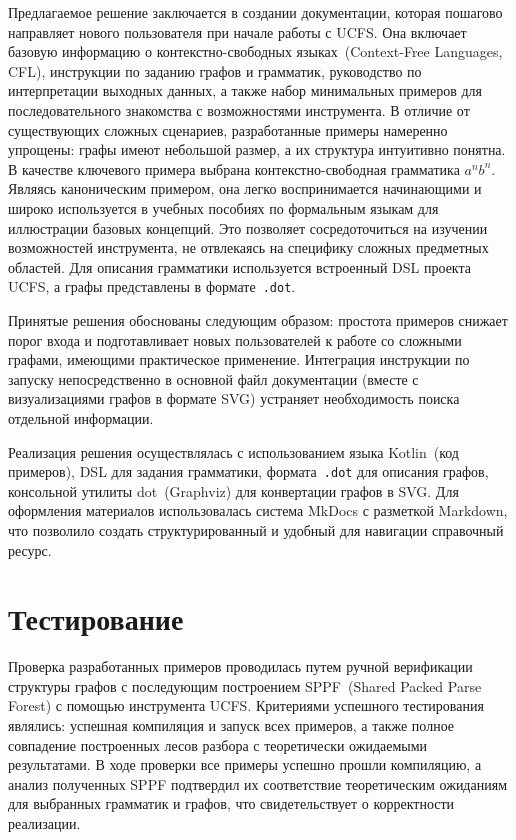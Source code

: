 \documentclass[a4paper]{article}
\begin{document}
Предлагаемое решение заключается в создании документации, которая пошагово направляет нового пользователя при начале работы с UCFS. Она включает базовую информацию о контекстно-свободных языках~(Context-Free Languages, CFL), инструкции по заданию графов и грамматик, руководство по интерпретации выходных данных, а также набор минимальных примеров для последовательного знакомства с возможностями инструмента. В отличие от существующих сложных сценариев, разработанные примеры намеренно упрощены: графы имеют небольшой размер, а их структура интуитивно понятна. В качестве ключевого примера выбрана контекстно-свободная грамматика $a^nb^n$. Являясь каноническим примером, она легко воспринимается начинающими и широко используется в учебных пособиях по формальным языкам для иллюстрации базовых концепций. Это позволяет сосредоточиться на изучении возможностей инструмента, не отвлекаясь на специфику сложных предметных областей. Для описания грамматики используется встроенный DSL проекта UCFS, а графы представлены в формате~\texttt{.dot}.

Принятые решения обоснованы следующим образом: простота примеров снижает порог входа и подготавливает новых пользователей к работе со сложными графами, имеющими практическое применение. Интеграция инструкции по запуску непосредственно в основной файл документации (вместе с визуализациями графов в формате SVG) устраняет необходимость поиска отдельной информации.

Реализация решения осуществлялась с использованием языка Kotlin~(код примеров), DSL для задания грамматики, формата~\texttt{.dot} для описания графов, консольной утилиты dot~(Graphviz) для конвертации графов в SVG. Для оформления материалов использовалась система MkDocs с разметкой Markdown, что позволило создать структурированный и удобный для навигации справочный ресурс.

\section{Тестирование}

Проверка разработанных примеров проводилась путем ручной верификации структуры графов с последующим построением SPPF~(Shared Packed Parse Forest) с помощью инструмента UCFS.
Критериями успешного тестирования являлись: успешная компиляция и запуск всех примеров, а также полное совпадение построенных лесов разбора с теоретически ожидаемыми результатами. В ходе проверки все примеры успешно прошли компиляцию, а анализ полученных SPPF подтвердил их соответствие теоретическим ожиданиям для выбранных грамматик и графов, что свидетельствует о корректности реализации.
\end{document}
